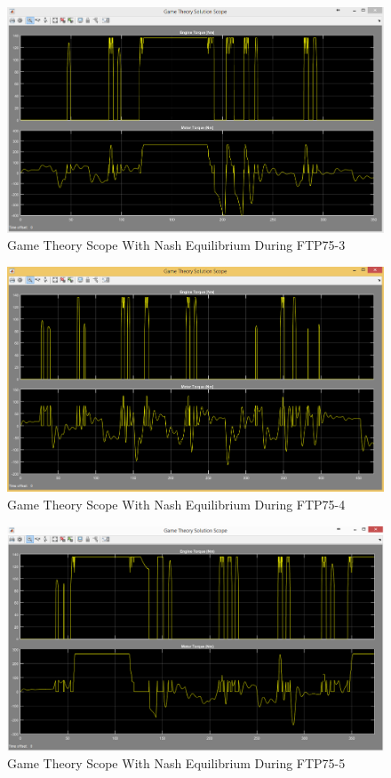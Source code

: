 \begin{figure}[h]
\centering
\includegraphics[scale=0.47]{figures/NashEquilibrium/FTP75-3/gameTheory15Juni}
\caption{Game Theory Scope With Nash Equilibrium During FTP75-3}
\label{fig:gtne3}
\end{figure}


\begin{figure}[h]
\centering
\includegraphics[scale=0.47]{figures/NashEquilibrium/FTP75-4/gameTheory15Juni}
\caption{Game Theory Scope With Nash Equilibrium During FTP75-4}
\label{fig:gtne4}
\end{figure}


\begin{figure}[h]
\centering
\includegraphics[scale=0.47]{figures/NashEquilibrium/FTP75-5/gameTheory16Juni}
\caption{Game Theory Scope With Nash Equilibrium During FTP75-5}
\label{fig:gtne5}
\end{figure}


